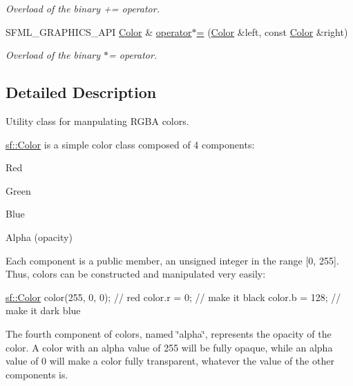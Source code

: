 \begin{DoxyCompactItemize}
\begin{DoxyCompactList}\small\item\em Overload of the binary += operator. \end{DoxyCompactList}\item 
S\-F\-M\-L\-\_\-\-G\-R\-A\-P\-H\-I\-C\-S\-\_\-\-A\-P\-I \hyperlink{classsf_1_1Color}{Color} \& \hyperlink{classsf_1_1Color_a8953be58a47ced92fb25966d6ee90511}{operator$\ast$=} (\hyperlink{classsf_1_1Color}{Color} \&left, const \hyperlink{classsf_1_1Color}{Color} \&right)
\begin{DoxyCompactList}\small\item\em Overload of the binary $\ast$= operator. \end{DoxyCompactList}\end{DoxyCompactItemize}


\subsection{Detailed Description}
Utility class for manpulating R\-G\-B\-A colors. 

\hyperlink{classsf_1_1Color}{sf\-::\-Color} is a simple color class composed of 4 components\-: \begin{DoxyItemize}
\item Red \item Green \item Blue \item Alpha (opacity)\end{DoxyItemize}
Each component is a public member, an unsigned integer in the range \mbox{[}0, 255\mbox{]}. Thus, colors can be constructed and manipulated very easily\-:


\begin{DoxyCode}
\hyperlink{classsf_1_1Color}{sf::Color} color(255, 0, 0); \textcolor{comment}{// red}
color.r = 0;                \textcolor{comment}{// make it black}
color.b = 128;              \textcolor{comment}{// make it dark blue}
\end{DoxyCode}


The fourth component of colors, named \char`\"{}alpha\char`\"{}, represents the opacity of the color. A color with an alpha value of 255 will be fully opaque, while an alpha value of 0 will make a color fully transparent, whatever the value of the other components is.

